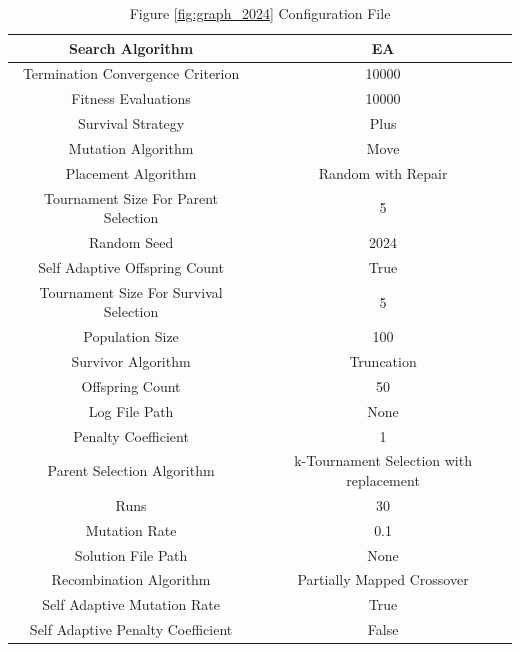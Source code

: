 \documentclass{standalone}
\begin{document}
\begin{table}[!htb]
	\centering
	\caption{Figure \ref{fig:graph_2024} Configuration File}
	\label{tab:graph_2024}
	\begin{tabular}{| c | c |}
		\hline
		Search Algorithm		& EA		 \\
		\hline
		Termination Convergence Criterion		& 10000		 \\
		\hline
		Fitness Evaluations		& 10000		 \\
		\hline
		Survival Strategy		& Plus		 \\
		\hline
		Mutation Algorithm		& Move		 \\
		\hline
		Placement Algorithm		& Random with Repair		 \\
		\hline
		Tournament Size For Parent Selection		& 5		 \\
		\hline
		Random Seed		& 2024		 \\
		\hline
		Self Adaptive Offspring Count		& True		 \\
		\hline
		Tournament Size For Survival Selection		& 5		 \\
		\hline
		Population Size		& 100		 \\
		\hline
		Survivor Algorithm		& Truncation		 \\
		\hline
		Offspring Count		& 50		 \\
		\hline
		Log File Path		& None		 \\
		\hline
		Penalty Coefficient		& 1		 \\
		\hline
		Parent Selection Algorithm		& k-Tournament Selection with replacement		 \\
		\hline
		Runs		& 30		 \\
		\hline
		Mutation Rate		& 0.1		 \\
		\hline
		Solution File Path		& None		 \\
		\hline
		Recombination Algorithm		& Partially Mapped Crossover		 \\
		\hline
		Self Adaptive Mutation Rate		& True		 \\
		\hline
		Self Adaptive Penalty Coefficient		& False		 \\
		\hline
	\end{tabular}
\end{table}
\end{document}
